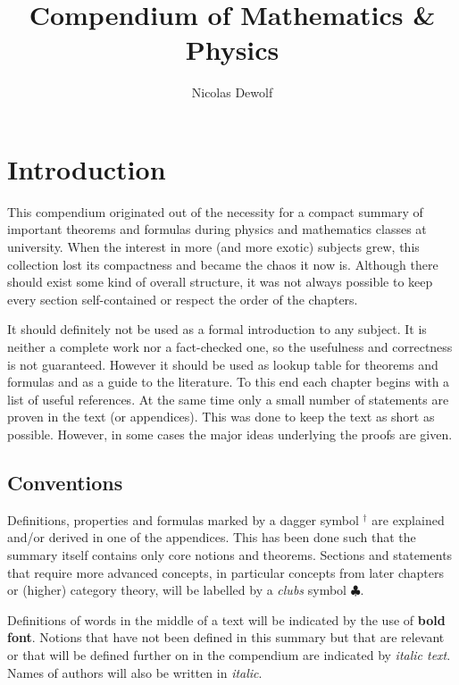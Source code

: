 \documentclass[11pt, a4paper]{report}
\begin{document}
\title{Compendium of Mathematics \& Physics}
\author{Nicolas Dewolf}
\maketitle

\tableofcontents

\chapter{Introduction}

    This compendium originated out of the necessity for a compact summary of important theorems and formulas during physics and mathematics classes at university. When the interest in more (and more exotic) subjects grew, this collection lost its compactness and became the chaos it now is. Although there should exist some kind of overall structure, it was not always possible to keep every section self-contained or respect the order of the chapters.

    It should definitely not be used as a formal introduction to any subject. It is neither a complete work nor a fact-checked one, so the usefulness and correctness is not guaranteed. However it should be used as lookup table for theorems and formulas and as a guide to the literature. To this end each chapter begins with a list of useful references. At the same time only a small number of statements are proven in the text (or appendices). This was done to keep the text as short as possible. However, in some cases the major ideas underlying the proofs are given.

\section{Conventions}

    Definitions, properties and formulas marked by a dagger symbol $^\dag$ are explained and/or derived in one of the appendices. This has been done such that the summary itself contains only core notions and theorems. Sections and statements that require more advanced concepts, in particular concepts from later chapters or (higher) category theory, will be labelled by a \textit{clubs} symbol $\clubsuit$.

    Definitions of words in the middle of a text will be indicated by the use of \textbf{bold font}. Notions that have not been defined in this summary but that are relevant or that will be defined further on in the compendium are indicated by \textit{italic text}. Names of authors will also be written in \textit{italic}.
\end{document}
